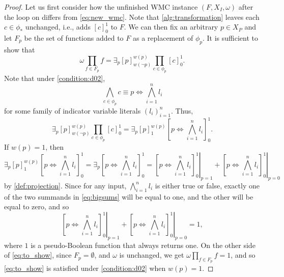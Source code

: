 \documentclass{article}
\theoremstyle{definition}
\theoremstyle{remark}
\begin{document}
\begin{proof}
  Let us first consider how the unfinished WMC instance $(F, X_I, \omega)$ after
  the loop on  differs from
  \cref{eq:new_wmc}. Note that \cref{alg:transformation} leaves each $c \in
  \phi_*$ unchanged, i.e., adds $[c]_0^1$ to $F$. We can then fix an arbitrary
  $p \in X_P$ and let $F_p$ be the set of functions added to $F$ as a
  replacement of $\phi_p$. It is sufficient to show that
  \begin{equation} \label{eq:to_show}
    \omega \prod_{f \in F_p} f = \exists_p [p]_{w(\neg p)}^{w(p)} \prod_{c \in \phi_p} [c]_0^1.
  \end{equation}
  Note that under \cref{condition:d02},
  \[
    \bigwedge_{c \in \phi_p} c \equiv p \Leftrightarrow \bigwedge_{i=1}^n l_i
  \]
  for some family of indicator variable literals $(l_i)_{i=1}^n$. Thus,
  \[
    \exists_p [p]_{w(\neg p)}^{w(p)} \prod_{c \in \phi_p} [c]_0^1 = \exists_p
    [p]_1^{w(p)} \left[ p \Leftrightarrow \bigwedge_{i=1}^n l_i \right]_0^1.
  \]
  If $w(p) = 1$, then
  \begin{equation} \label{eq:bigsums}
    \exists_p [p]_1^{w(p)} \left[ p \Leftrightarrow \bigwedge_{i=1}^n l_i
    \right]_0^1 = \exists_p \left[ p \Leftrightarrow \bigwedge_{i=1}^n l_i
    \right]_0^1 = \left.\left[ p \Leftrightarrow \bigwedge_{i=1}^n l_i
    \right]_0^1\right|_{p=1} + \left.\left[ p \Leftrightarrow \bigwedge_{i=1}^n
      l_i \right]_0^1\right|_{p=0}
  \end{equation}
  by \cref{def:projection}. Since for any input, $\bigwedge_{i=1}^n l_i$ is
  either true or false, exactly one of the two summands in \cref{eq:bigsums}
  will be equal to one, and the other will be equal to zero, and so
  \[
    \left.\left[ p \Leftrightarrow \bigwedge_{i=1}^n l_i
      \right]_0^1\right|_{p=1} + \left.\left[ p \Leftrightarrow \bigwedge_{i=1}^n
        l_i \right]_0^1\right|_{p=0} = 1,
  \]
  where $1$ is a pseudo-Boolean function that always returns one. On the other
  side of \cref{eq:to_show}, since $F_p = \emptyset$, and $\omega$ is unchanged,
  we get $\omega\prod_{f \in F_p} f = 1$, and so \cref{eq:to_show} is satisfied
  under \cref{condition:d02} when $w(p) = 1$.


\end{proof}
\end{document}
